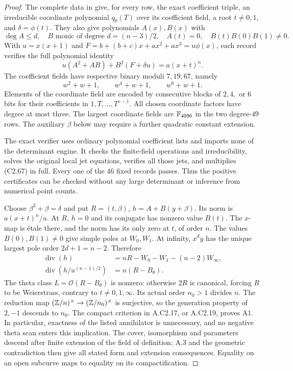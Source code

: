 \begin{proof}
The complete data in
give, for every row, the exact coefficient
triple, an irreducible coordinate polynomial
$q_0(T)$ over its coefficient field, a root
$t\ne0,1$, and $\delta=\phi(t)$.
They also give polynomials $A(x),B(x)$ with
\[
 \deg A\le d,\quad B\text{ monic of degree }d=(n-3)/2,
 \quad A(t)=0,\quad B(t)B(0)B(1)\ne0.
\]
With $u=x(x+1)$ and
$F=b+(b+c)x+ax^2+ax^3=u\phi(x)$, each record
verifies the full polynomial identity
\[
            u(A^2+AB)+B^2(F+\delta u)=a(x+t)^n.                \tag{C2.67}
\]
The coefficient fields have respective binary
moduli $7,19,67$, namely
\[
 w^2+w+1,\qquad w^4+w+1,\qquad w^6+w+1.
\]
Elements of the coordinate field are encoded
by consecutive blocks of $2,4,$ or $6$ bits
for their coefficients in $1,T,\ldots,T^{e-1}$.
All chosen coordinate factors have degree
at most three. The largest coordinate fields
are $\mathbb F_{4096}$ in the two degree-$49$ rows.
The auxiliary $\beta$ below may require a
further quadratic constant extension.

The exact verifier
uses ordinary polynomial coefficient lists
and imports none of the determinant engine.
It checks the finite-field operations and
irreducibility, solves the original local
jet equations, verifies all those jets, and
multiplies (C2.67) in full. Every one of the
$46$ fixed records passes. Thus the positive
certificates can be checked without any
large determinant or inference from numerical
point counts.

Choose $\beta^2+\beta=\delta$ and put
$R=(t,\beta)$, $h=A+B(y+\beta)$.
Its norm is $a(x+t)^n/u$. At $R$, $h=0$
and its conjugate has nonzero value $B(t)$.
The $x$-map is \'etale there, and the norm
has its only zero at $t$, of order $n$.
The values $B(0),B(1)\ne0$ give simple poles
at $W_0,W_1$. At infinity, $x^dy$ has the
unique largest pole order $2d+1=n-2$.
Therefore
\[
 \begin{aligned}
 \operatorname{div}(h)&=nR-W_0-W_1-(n-2)W_\infty,\\
 \operatorname{div}(h/u^{(n-1)/2})&=n(R-B_\theta).
 \end{aligned}                                                 \tag{C2.68}
\]
The theta class $L=\mathcal O(R-B_\theta)$
is nonzero: otherwise $2R$ is canonical,
forcing $R$ to be Weierstrass, contrary to
$t\ne0,1,\infty$.
Its actual order $n_0>1$ divides $n$.
The reduction map $(\mathbb Z/n)^\times\to(\mathbb Z/n_0)^\times$
is surjective, so the generation property
of $2,-1$ descends to $n_0$.
The compact criterion in A.C2.17, or A.C2.19,
proves A1. In particular, exactness of the
listed annihilator is unnecessary, and no
negative theta scan enters this implication.
The cover, isomorphism and parameters descend
after finite extension of the field of
definition; A.3 and the geometric contradiction
then give all stated form and extension
consequences. Equality on an open subcurve
maps to equality on its compactification.


\end{proof}
